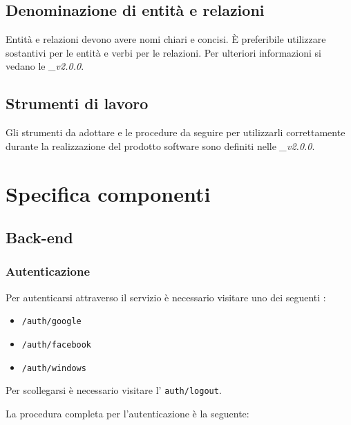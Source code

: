\documentclass[12pt,a4paper]{article}
\begin{document}

\subsection{Denominazione di entità e relazioni}
Entità e relazioni devono avere nomi chiari e concisi. È preferibile utilizzare sostantivi
per le entità e verbi per le relazioni. Per ulteriori informazioni si vedano
le \textit{\NdP\_v2.0.0}.

\subsection{Strumenti di lavoro}
Gli strumenti da adottare e le procedure da seguire per utilizzarli correttamente durante la realizzazione 
del prodotto software sono definiti nelle \textit{\NdP\_v2.0.0}.

\newpage
\section{Specifica componenti}

\subsection{Back-end}

\subsubsection{Autenticazione}

Per autenticarsi attraverso il servizio è necessario visitare uno dei seguenti :

\begin{itemize}
    \item \texttt{/auth/google}
    \item \texttt{/auth/facebook}
    \item \texttt{/auth/windows}
\end{itemize}

Per scollegarsi è necessario visitare l' \texttt{auth/logout}.

La procedura completa per l'autenticazione è la seguente:
\end{document}
